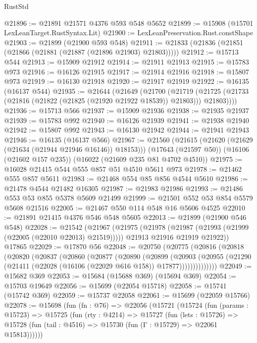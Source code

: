 \begin{lexlean}{RustStd}
\begin{coremodule}
@21896 := @21891 @21571 @4376 @593 @548 @5652
@21899 := @15908 (@15701 LexLeanTarget.RustSyntax.Lit)
@21900 := LexLeanPreservation.Rust.constShape
@21903 := @21899 (@21900 @593 @548)
@21911 := @21833 (@21836 (@21851 (@21866 (@21881 (@21887 (@21896 @21903) @21803)))))
@21912 := @15713 @544
@21913 := @15909 @21912
@21914 := @21911 @21913
@21915 := @15783 @973
@21916 := @16126 @21915
@21917 := @21914 @21916
@21918 := @15807 @973
@21919 := @16130 @21918
@21920 := @21917 @21919
@21922 := @16135 (@16137 @544)
@21935 := @21644
    (@21649
      (@21700
        (@21719 (@21725 (@21733 (@21816 (@21822 (@21825 (@21920 @21922 @18539)) @21803))) @21803))))
@21936 := @15713 @566
@21937 := @15909 @21936
@21938 := @21935 @21937
@21939 := @15783 @992
@21940 := @16126 @21939
@21941 := @21938 @21940
@21942 := @15807 @992
@21943 := @16130 @21942
@21944 := @21941 @21943
@21946 := @16135 (@16137 @566)
@21967 := @21560
    (@21615 (@21620 (@21629 (@21634 (@21944 @21946 @16146)) @18153)))
    (@17643 (@21597 @50))
    (@16106 (@21602 @157 @235))
    (@16022 (@21609 @235 @81 @4702 @4510))
@21975 := @16028 @21415 @544 @555 @857 @51 @4510 @5611 @973
@21978 := @21462 @555 @857 @5611
@21983 := @21468 @554 @85 @856 @4544 @5610
@21986 := @21478 @4544 @21482 @16305
@21987 := @21983 @21986
@21993 := @21486 @553 @53 @855 @5378 @5609 @21499
@21999 := @21501 @552 @53 @854 @5579 @5608 @21516
@22005 := @21467 @550 @114 @548 @16 @5606 @4525
@22010 := @21891 @21415 @4376 @546 @548 @5605
@22013 := @21899 (@21900 @546 @548)
@22028 := @21542
    (@21967
      (@21975
        (@21978 (@21987 (@21993 (@21999 (@22005 (@22010 @22013) @21519)))))
        @21913
        @21916
        @21919
        @21922))
    @17865
@22029 := @17870 @56
@22048 := @20750
    (@20775
      (@20816
        (@20818
          (@20820
            (@20837
              (@20860
                (@20877
                  (@20890
                    (@20899
                      (@20903
                        (@20955
                          (@21290 (@21411 (@22028 (@16106 (@22029 @616 @158)) @17877))))))))))))))
@22049 := @15682 @369
@22053 := @15684 (@15688 @369) (@15694 @369)
@22054 := @15703 @19649
@22056 := @15699 (@22054 @15718)
@22058 := @15741 (@15742 @369)
@22059 := @15737 @22058
@22061 := @15699 (@22059 @15766)
@22078 := @15698
    (fun (fn : @76) =>
    @22056
      (@15721
        (@15724
          (fun (params : @15723) =>
          @15725
            (fun (rty : @4214) =>
            @15727
              (fun (lets : @15726) =>
              @15728 (fun (tail : @4516) => @15730 (fun (Γ : @15729) => @22061 @15813))))))

\end{coremodule}
\end{lexlean}

